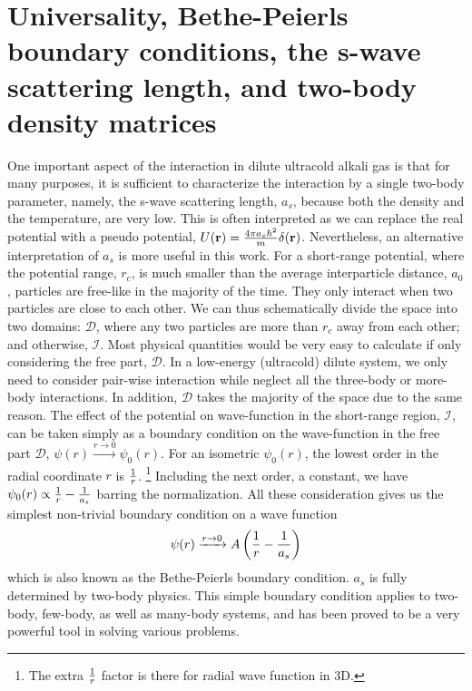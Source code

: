 \section{Universality,  Bethe-Peierls boundary conditions, the s-wave scattering length, and  two-body density matrices \label{sec:intro:as}}
One important aspect of the interaction in dilute ultracold alkali gas is that for many purposes, it is sufficient to characterize the interaction  by a single two-body parameter, namely, the s-wave scattering length, $a_s$,  because  both the density  and the temperature, are very  low. This is often interpreted as we can replace the real potential with a pseudo potential, $U(\mathbf{r})=\frac{4\pi{}a_{s}\hbar^{2}}{m}\delta(\mathbf{r})$\cite{pethick, LeggettBEC}.  Nevertheless, an alternative interpretation of $a_s$ \cite{LeggettBEC, Tan2008-1,Tan2008-2,CombescotTan} is more useful in this work.  For a short-range potential, where the potential range, $r_c$, is much smaller than the average interparticle distance, $a_0$,  particles are free-like  in the majority of the time.  They only interact  when two particles are close to each other.  We can thus schematically divide the space into two domains: $\mathcal{D}$, where any two particles are more than $r_c$ away from each other; and otherwise, $\mathcal{I}$. Most physical quantities would be very easy to calculate if only considering the free part, $\mathcal{D}$.  In a low-energy (ultracold) dilute system, we only need to consider  pair-wise interaction while neglect all the three-body or more-body interactions.  In addition,  $\mathcal{D}$ takes the majority of the space due to the same reason.     The effect of the potential on wave-function in the short-range region, $\mathcal{I}$, can be taken simply as   a boundary condition on the wave-function in the free part $\mathcal{D}$, $\psi(r)\xrightarrow{r\to0}\psi_{0}(r)$.  For an isometric $\psi_{0}(r)$, the lowest order in the radial coordinate $r$ is $\frac{1}{r}$. \footnote{The extra $\frac{1}{r}$ factor is there for  radial wave function in 3D.}  Including the next order, a constant,  we have $\psi_{0}(r)\propto\frac{1}{r}-\frac{1}{a_s}$ barring the normalization.  All these consideration gives us the simplest non-trivial boundary condition on  a wave function
\begin{equation}\label{eq:intro:Bethe}
\psi(r)\xrightarrow{r\to0}A\left(\frac{1}{r}-\frac{1}{a_s}\right)
\end{equation}
which is also known as the Bethe-Peierls boundary condition\cite{BethePeierls}.    $a_{s}$ is fully determined by two-body physics.  This simple boundary condition applies to two-body, few-body, as well as many-body systems, and has been proved to be a very powerful tool in solving various problems.  

